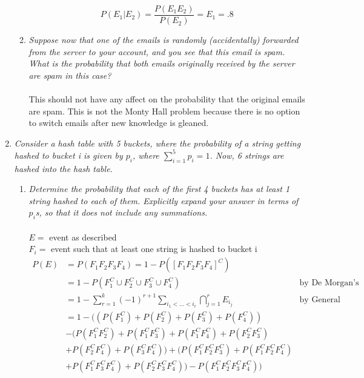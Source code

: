 \documentclass{article} %
\begin{document}
\begin{enumerate}
\begin{enumerate}
		$$P(E_1 | E_2) = \frac{P(E_1E_2)}{P(E_2)} = E_1 = .8$$
		
		\item \textit{Suppose now that one of the emails is randomly (accidentally) forwarded from the server to your account, and you see that this email is spam. What is the probability that both emails originally received by the server are spam in this case?}\\
		\\
		This should not have any affect on the probability that the original emails are spam. This is not the Monty Hall problem because there is no option to switch emails after new knowledge is gleaned.
	
	\end{enumerate}
	
	\item \textit{Consider a hash table with 5 buckets, where the probability of a string getting hashed to bucket i is given by $p_i$, where $\sum_{i = 1}^{5} p_i = 1$. Now, 6 strings are hashed into the hash table.}
	\begin{enumerate}
		\item \textit{Determine the probability that each of the first 4 buckets has at least 1 string hashed to each of them. Explicitly expand your answer in terms of $p_i$s, so that it does not include any summations.}\\
		\\
		$E =$ event as described\\
		$F_i =$ event such that at least one string is hashed to bucket i
		\begin{align*}
		P(E) &= P(F_1F_2F_3F_4) = 1 - P([F_1F_2F_3F_4]^C)\\
		&= 1 - P(F_1^C \cup F_2^C \cup F_3^C \cup F_4^C) &\text{by De Morgan's Laws}\\
		&= 1 - \sum_{r = 1}^{k} (-1)^{r + 1} \sum_{i_1 < ... < i_r} \bigcap_{j = 1}^{r} E_{i_j} &\text{by General Inclusion/Exclusion}\\
		&= 1 - ((P(F_1^C) + P(F_2^C) + P(F_3^C) + P(F_4^C))\\
		&- (P(F_1^CF_2^C) + P(F_1^CF_3^C) + P(F_1^CF_4^C) + P(F_2^CF_3^C)\\
		&+ P(F_2^CF_4^C) + P(F_3^CF_4^C)) + (P(F_1^CF_2^CF_3^C) + P(F_1^CF_2^CF_4^C)\\
		&+ P(F_1^CF_3^CF_4^C) + P(F_2^CF_3^CF_4^C)) - P(F_1^CF_2^CF_3^CF_4^C))
		\end{align*}
		

\end{enumerate}
\end{enumerate}
\end{document}
